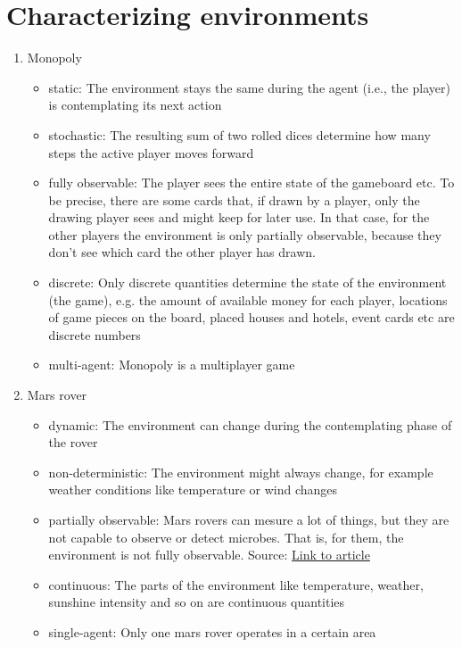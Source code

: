 \documentclass{article} %
\begin{document}
\section{Characterizing environments}


\begin{enumerate}
    \item Monopoly
    \begin{itemize}
        \item static: The environment stays the same during the agent
        (i.e., the player) is contemplating its next action
        \item stochastic: The resulting sum of two rolled dices
        determine how many steps the active player moves forward
        \item fully observable: The player sees the entire state
        of the gameboard etc. To be precise, there are some cards
        that, if drawn by a player, only the drawing player sees and
        might keep for later use. In that case, for the other players
        the environment is only partially observable, because they
        don't see which card the other player has drawn.
        \item discrete: Only discrete quantities determine the state
        of the environment (the game), e.g. the amount of 
        available money for each player, locations of game pieces
        on the board, placed houses and hotels, event cards etc
        are discrete numbers
        \item multi-agent: Monopoly is a multiplayer game
    \end{itemize}
    \item Mars rover
    \begin{itemize}
        \item dynamic: The environment can change during the
        contemplating phase of the rover
        \item non-deterministic: The environment might always change,
        for example weather conditions like temperature or wind changes
        \item partially observable: Mars rovers can mesure a lot of
        things, but they are not capable to observe or detect
        microbes. That is, for them, the environment is not
        fully observable.
        Source: \href{https://t3n.de/news/leben-mars-rover-sensoren-ungenau-1536159/}{Link to article}
        \item continuous: The parts of the environment like temperature, weather, sunshine intensity
        and so on are continuous quantities
        \item single-agent: Only one mars rover operates in a certain area
    \end{itemize}
\end{enumerate}
\end{document}
